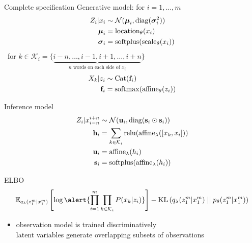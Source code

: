 \begin{frame}[plain]{Complete specification}
Generative model: for $i=1, \ldots, m$\\

\begin{equation*}
\begin{aligned}
Z_i|x_i &\sim \mathcal N(\boldsymbol \mu_{i}, \operatorname{diag}(\boldsymbol \sigma_{i}^2))\\
\boldsymbol \mu_{i} &= \text{location}_\theta(x_i)\\
\boldsymbol \sigma_{i} &= \operatorname{softplus}(\text{scale}_\theta(x_i))
\end{aligned}
\end{equation*}
\pause
~for $k \in \mathcal K_i = \{\underbrace{i-n, \ldots, i-1,  i+1, \ldots, i+n}_{n \text{ words on each side of }x_i}\}$ \pause
\begin{equation*}
\begin{aligned}
X_k|z_i &\sim \operatorname{Cat}(\mathbf f_i) \\ 
\mathbf f_i &= \operatorname{softmax}(\operatorname{affine}_\theta(z_i))
\end{aligned}
\end{equation*}

\pause

Inference model
\begin{equation*}
\begin{aligned}
Z_i|x_{i-n}^{i+n} &\sim \mathcal N(\mathbf u_i, \operatorname{diag}(\mathbf s_i \odot \mathbf s_i))\\
\mathbf h_i &= \sum_{k \in \mathcal K_i} \operatorname{relu}(\operatorname{affine}_\lambda([x_k, x_i])) \\
\mathbf u_i &= \operatorname{affine}_\lambda(h_i) \\
\mathbf s_i &= \operatorname{softplus}(\operatorname{affine}_\lambda(h_i)) 
\end{aligned}
\end{equation*}


\end{frame}

\begin{frame}{ELBO}
\begin{equation*}
\begin{aligned}
\mathbb E_{q_\lambda(z_1^m|x_1^m)} \left[ \log \alert{\prod_{i=1}^m \prod_{k \in \mathcal K_i} P(x_k|z_i)} \right] - \KL{q_\lambda(z_1^m|x_1^m)}{p_\theta(z_1^m|x_1^m)}
\end{aligned}
\end{equation*}
\begin{itemize}
	\item observation model is trained discriminatively\\
	latent variables generate overlapping subsets of observations
\end{itemize}

\end{frame}

